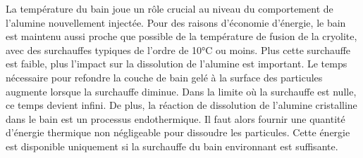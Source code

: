 La température du bain joue un rôle crucial au niveau du comportement
de l'alumine nouvellement injectée. Pour des raisons d'économie
d'énergie, le bain est maintenu aussi proche que possible de la
température de fusion de la cryolite, avec des surchauffes typiques de
l'ordre de \num{10}\si{\celsius} ou moins. Plus cette surchauffe est
faible, plus l'impact sur la dissolution de l'alumine est
important. Le temps nécessaire pour refondre la couche de bain gelé à
la surface des particules augmente lorsque la surchauffe diminue. Dans
la limite où la surchauffe est nulle, ce temps devient infini. De
plus, la réaction de dissolution de l'alumine cristalline dans le bain
est un processus endothermique. Il faut alors fournir une quantité
d'énergie thermique non négligeable pour dissoudre les
particules. Cette énergie est disponible uniquement si la surchauffe
du bain environnant est suffisante.
